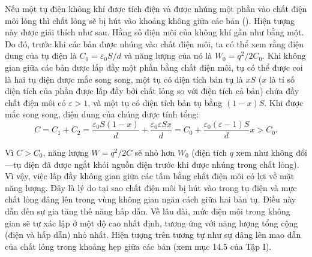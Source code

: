 Nếu một tụ điện không khí được tích điện và được nhúng một phần vào chất điện môi lỏng thì chất lỏng sẽ bị hút vào khoảng không giữa các bản (). Hiện tượng này được giải thích như sau. Hằng số điện môi của không khí gần như bằng một. Do đó, trước khi các bản được nhúng vào chất điện môi, ta có thể xem rằng điện dung của tụ điện là $C_0=\varepsilon_0S/d$ và năng lượng của nó là $W_0=q^2/2C_0$. Khi không gian giữa các bản được lấp đầy một phần bằng chất điện môi, tụ có thể được coi là hai tụ điện được mắc song song, một tụ có diện tích bản tụ là $xS$ ($x$ là tỉ số diện tích của phần được lấp đầy bởi chất lỏng so với điện tích cả bản) chứa đầy chất điện môi có $\varepsilon>1$, và một tụ có diện tích bản tụ bằng $(1-x)S$. Khi được mắc song song, điện dung của chúng được tính tổng: 
\begin{equation*}
	C = C_1 + C_2 = \frac{\varepsilon_0 S (1-x)}{d} + \frac{\varepsilon_0 \varepsilon S x}{d} = C_0 + \frac{\varepsilon_0 (\varepsilon - 1) S}{d} x > C_0.
\end{equation*}

\noindent
Vì $C>C_0$, năng lượng $W=q^2/2C$ sẽ nhỏ hơn $W_0$ (điện tích $q$ xem như không đổi---tụ điện đã được ngắt khỏi nguồn điện trước khi được nhúng trong chất lỏng). Vì vậy, việc lấp đầy không gian giữa các tấm bằng chất điện môi có lợi về mặt năng lượng. Đây là lý do tại sao chất điện môi bị hút vào trong tụ điện và mực chất lỏng dâng lên trong vùng không gian ngăn cách giữa hai bản tụ. Điều này dẫn đến sự gia tăng thế năng hấp dẫn. Về lâu dài, mức điện môi trong không gian sẽ tự xác lập ở một độ cao nhất định, tương ứng với năng lượng tổng cộng (điện và hấp dẫn) nhỏ nhất. Hiện tượng trên tương tự như sự dâng lên mao dẫn của chất lỏng trong khoảng hẹp giữa các bản (xem mục 14.5 của Tập I).

